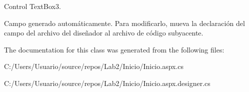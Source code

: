 Control Text\+Box3. 

Campo generado automáticamente. Para modificarlo, mueva la declaración del campo del archivo del diseñador al archivo de código subyacente. 

The documentation for this class was generated from the following files\+:\begin{DoxyCompactItemize}
\item 
C\+:/\+Users/\+Usuario/source/repos/\+Lab2/\+Inicio/Inicio.\+aspx.\+cs\item 
C\+:/\+Users/\+Usuario/source/repos/\+Lab2/\+Inicio/Inicio.\+aspx.\+designer.\+cs\end{DoxyCompactItemize}

